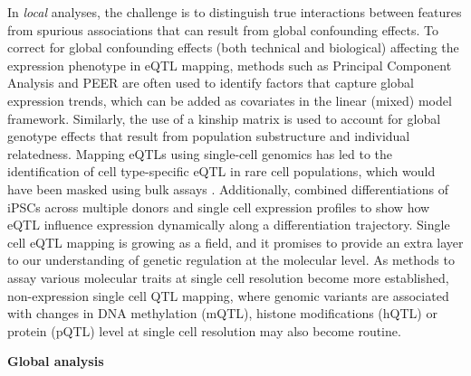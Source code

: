 In \textit{local} analyses, the challenge is to distinguish true interactions between features from spurious associations that can result from global confounding effects. To correct for global confounding effects (both technical and biological) affecting the expression phenotype in eQTL mapping, methods such as Principal Component Analysis and PEER \cite{Stegle2010} are often used to identify factors that capture global expression trends, which can be added as covariates in the linear (mixed) model framework. Similarly, the use of a kinship matrix is used to account for global genotype effects that result from population substructure and individual relatedness. Mapping eQTLs using single-cell genomics has led to the identification of cell type-specific eQTL in rare cell populations, which would have been masked using bulk assays \cite{VanDerWijst2018}. Additionally, \cite{Cuomo2020} combined differentiations of iPSCs across multiple donors and single cell expression profiles to show how eQTL influence expression dynamically along a differentiation trajectory. Single cell eQTL mapping is growing as a field, and it promises to provide an extra layer to our understanding of genetic regulation at the molecular level. As methods to assay various molecular traits at single cell resolution become more established, non-expression single cell QTL mapping, where genomic variants are associated with changes in DNA methylation (mQTL), histone modifications (hQTL) or protein (pQTL) level at single cell resolution may also become routine.

\textbf{Global analysis}


